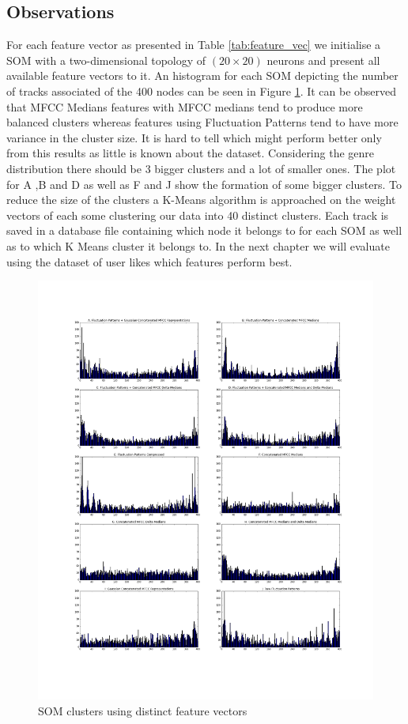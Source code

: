 \documentclass[cic,tc,english]{iiufrgs}
\begin{document}
\subsection{Observations}
For each feature vector as presented in Table \ref{tab:feature_vec} we initialise a SOM with a two-dimensional topology of $(20 \times 20)$ neurons and present all available feature vectors to it. An histogram for each SOM depicting the number of tracks associated of the 400 nodes can be seen in Figure \ref{fig:clusters}. It can be observed that MFCC Medians features with MFCC medians tend to produce more balanced clusters whereas features using Fluctuation Patterns tend to have more variance in the cluster size. It is hard to tell which might perform better only from this results as little is known about the dataset. Considering the genre distribution there should be 3 bigger clusters and a lot of smaller ones. The plot for A ,B and D as well as F and J show the formation of some bigger clusters. To reduce the size of the clusters a K-Means algorithm is approached on the weight vectors of each some clustering our data into 40 distinct clusters. Each track is saved in a database file containing which node it belongs to for each SOM as well as to which K Means cluster it belongs to. In the next chapter we will evaluate using the dataset of user likes which features perform best.


\begin{figure}
    \caption{SOM clusters using distinct feature vectors}
    \begin{center}
        \includegraphics[trim=140 0 140 0, clip, width=\linewidth]{clusters}
    \end{center}
    \label{fig:clusters}
\end{figure}
\end{document}
